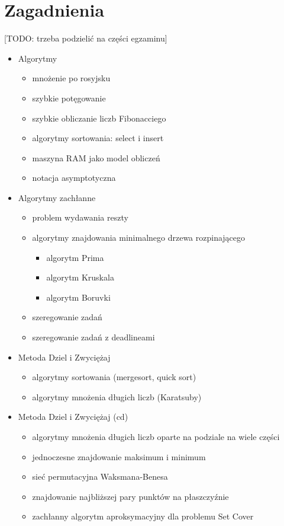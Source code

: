 \chapter{Zagadnienia}
[TODO: trzeba podzielić na części egzaminu]
\begin{itemize}

\item Algorytmy
\begin{itemize}
	\item mnożenie po rosyjsku
	\item szybkie potęgowanie
	\item szybkie obliczanie liczb Fibonacciego
	\item algorytmy sortowania: select i insert
	\item maszyna RAM jako model obliczeń
	\item notacja asymptotyczna
\end{itemize}

\item Algorytmy zachłanne
\begin{itemize}
	\item problem wydawania reszty
	\item algorytmy znajdowania minimalnego drzewa rozpinającego
	\begin{itemize}
		\item algorytm Prima
		\item algorytm Kruskala
		\item algorytm Boruvki
	\end{itemize}
	\item szeregowanie zadań
	\item szeregowanie zadań z deadlineami
\end{itemize}

\item Metoda Dziel i Zwyciężaj
\begin{itemize}
	\item algorytmy sortowania (mergesort, quick sort)
	\item algorytmy mnożenia długich liczb (Karatsuby)
\end{itemize}

\item Metoda Dziel i Zwyciężaj (cd)
\begin{itemize}
	\item algorytmy mnożenia długich liczb oparte na podziale na wiele części
	\item jednoczesne znajdowanie maksimum i minimum
	\item sieć permutacyjna Waksmana-Benesa
	\item znajdowanie najbliższej pary punktów na płaszczyźnie
	\item zachłanny algorytm aproksymacyjny dla problemu Set Cover
\end{itemize}


\end{itemize}
